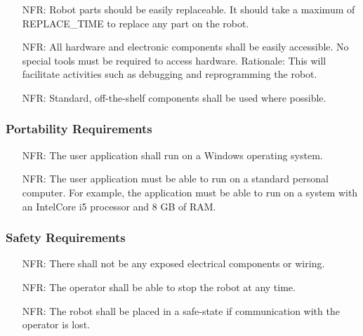\documentclass[12pt]{article}
\newcounter{nfrnum} %
\begin{document}
\noindent \begin{itemize}
\item[NFR\refstepcounter{nfrnum}\thenfrnum \label{NFR_Maintainability1}:] Robot parts should be easily replaceable. It should take a maximum of REPLACE\_TIME to replace any part on the robot.
\item[NFR\refstepcounter{nfrnum}\thenfrnum \label{NFR_Maintainability2}:] All hardware and electronic components shall be easily accessible. No special tools must be required to access hardware. 
\newline Rationale: This will facilitate activities such as debugging and reprogramming the robot. 
\item[NFR\refstepcounter{nfrnum}\thenfrnum \label{NFR_Maintainability2}:] Standard, off-the-shelf components shall be used where possible. 
\end{itemize}

\subsubsection{Portability Requirements}

\noindent \begin{itemize}
\item[NFR\refstepcounter{nfrnum}\thenfrnum \label{NFR_Portability1}:] The user application shall run on a Windows operating system.
\item[NFR\refstepcounter{nfrnum}\thenfrnum \label{NFR_Portability2}:] The user application must be able to run on a standard personal computer. For example, the application must be able to run on a system with an IntelCore i5 processor and 8 GB of RAM.
\end{itemize}

\subsubsection{Safety Requirements}
\noindent \begin{itemize}
\item[NFR\refstepcounter{nfrnum}\thenfrnum \label{NFR_Safety1}:] There shall not be any exposed electrical components or wiring.
\item[NFR\refstepcounter{nfrnum}\thenfrnum \label{NFR_Safety1}:] The operator shall be able to stop the robot at any time.
\item[NFR\refstepcounter{nfrnum}\thenfrnum \label{NFR_Safety2}:] The robot shall be placed in a safe-state if communication with the operator is lost.
\end{itemize}
\end{document}
